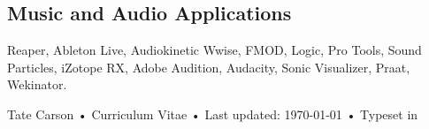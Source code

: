\documentclass[12pt, a4paper]{article}
\begin{document}
\subsection*{Music and Audio Applications}
Reaper, Ableton Live, Audiokinetic Wwise, FMOD, Logic, Pro Tools, Sound Particles, iZotope RX, Adobe Audition, Audacity, Sonic Visualizer, Praat, Wekinator. \\



\vfill{}

\begin{center}
{\scriptsize  Tate Carson •\- Curriculum Vitae •\- Last updated: \today\- •\- %
Typeset in \href{http://nitens.org/taraborelli/cvtex}{
\XeTeX }\\
}
\end{center}
\end{document}
